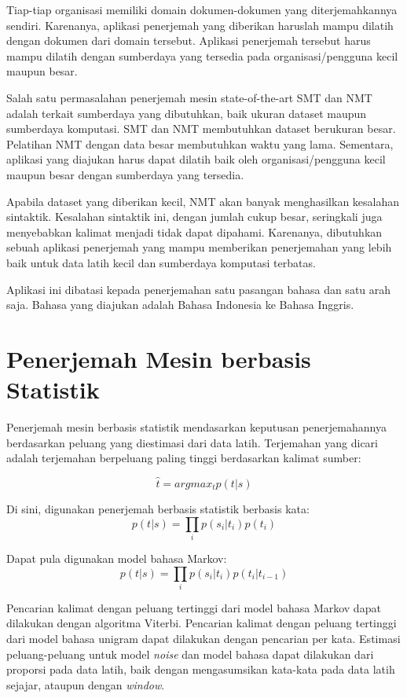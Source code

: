 \documentclass[conference]{IEEEtran}
\begin{document}
Tiap-tiap organisasi memiliki domain dokumen-dokumen yang diterjemahkannya sendiri. Karenanya, aplikasi penerjemah yang diberikan haruslah mampu dilatih dengan dokumen dari domain tersebut. Aplikasi penerjemah tersebut harus mampu dilatih dengan sumberdaya yang tersedia pada organisasi/pengguna kecil maupun besar.

Salah satu permasalahan penerjemah mesin state-of-the-art SMT dan NMT adalah terkait sumberdaya yang dibutuhkan, baik ukuran dataset maupun sumberdaya komputasi. SMT dan NMT membutuhkan dataset berukuran besar. Pelatihan NMT dengan data besar membutuhkan waktu yang lama. Sementara, aplikasi yang diajukan harus dapat dilatih baik oleh organisasi/pengguna kecil maupun besar dengan sumberdaya yang tersedia.

Apabila dataset yang diberikan kecil, NMT akan banyak menghasilkan kesalahan sintaktik. Kesalahan sintaktik ini, dengan jumlah cukup besar, seringkali juga menyebabkan kalimat menjadi tidak dapat dipahami. Karenanya, dibutuhkan sebuah aplikasi penerjemah yang mampu memberikan penerjemahan yang lebih baik untuk data latih kecil dan sumberdaya komputasi terbatas.

Aplikasi ini dibatasi kepada penerjemahan satu pasangan bahasa dan satu arah saja. Bahasa yang diajukan adalah Bahasa Indonesia ke Bahasa Inggris.

\section{Penerjemah Mesin berbasis Statistik}

Penerjemah mesin berbasis statistik mendasarkan keputusan penerjemahannya berdasarkan peluang yang diestimasi dari data latih. Terjemahan yang dicari adalah terjemahan berpeluang paling tinggi berdasarkan kalimat sumber:

\begin{equation}
\hat{t} = argmax_t p(t|s)
\end{equation}

Di sini, digunakan penerjemah berbasis statistik berbasis kata:
\begin{equation}
p(t|s) = \prod_i p(s_i|t_i)p(t_i)
\end{equation}

Dapat pula digunakan model bahasa Markov:
\begin{equation}
p(t|s) = \prod_i p(s_i|t_i)p(t_i|t_{i-1})
\end{equation}

Pencarian kalimat dengan peluang tertinggi dari model bahasa Markov dapat dilakukan dengan algoritma Viterbi. Pencarian kalimat dengan peluang tertinggi dari model bahasa unigram dapat dilakukan dengan pencarian per kata. Estimasi peluang-peluang untuk model \textit{noise} dan model bahasa dapat dilakukan dari proporsi pada data latih, baik dengan mengasumsikan kata-kata pada data latih sejajar, ataupun dengan \textit{window}.
\end{document}
